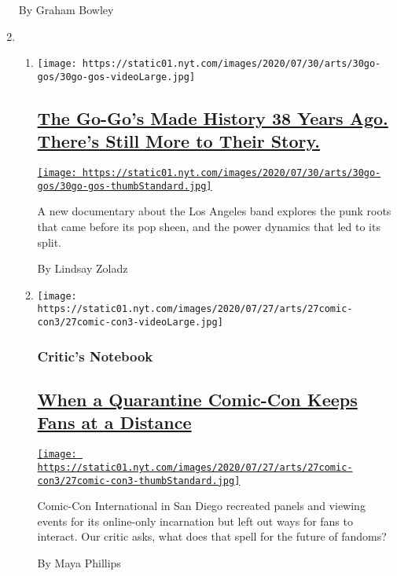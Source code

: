 \begin{enumerate}
  By Graham Bowley
\item
  \begin{enumerate}
  \def\labelenumii{\arabic{enumii}.}
  \item
    \texttt{[image: https://static01.nyt.com/images/2020/07/30/arts/30go-gos/30go-gos-videoLarge.jpg]}

    \hypertarget{the-go-gos-made-history-38-years-ago-theres-still-more-to-their-story}{%
    \subsection{\texorpdfstring{\href{/2020/07/29/arts/music/the-go-gos-documentary.html}{The
    Go-Go's Made History 38 Years Ago. There's Still More to Their
    Story.}}{The Go-Go's Made History 38 Years Ago. There's Still More to Their Story.}}\label{the-go-gos-made-history-38-years-ago-theres-still-more-to-their-story}}

    \href{/2020/07/29/arts/music/the-go-gos-documentary.html}{\texttt{[image: https://static01.nyt.com/images/2020/07/30/arts/30go-gos/30go-gos-thumbStandard.jpg]}}

    A new documentary about the Los Angeles band explores the punk roots
    that came before its pop sheen, and the power dynamics that led to
    its split.

    By Lindsay Zoladz
  \item
    \texttt{[image: https://static01.nyt.com/images/2020/07/27/arts/27comic-con3/27comic-con3-videoLarge.jpg]}

    \hypertarget{critics-notebook}{%
    \subsubsection{Critic's Notebook}\label{critics-notebook}}

    \hypertarget{when-a-quarantine-comic-con-keeps-fans-at-a-distance}{%
    \subsection{\texorpdfstring{\href{/2020/07/29/arts/comic-con-fandom-quarantine.html}{When
    a Quarantine Comic-Con Keeps Fans at a
    Distance}}{When a Quarantine Comic-Con Keeps Fans at a Distance}}\label{when-a-quarantine-comic-con-keeps-fans-at-a-distance}}

    \href{/2020/07/29/arts/comic-con-fandom-quarantine.html}{\texttt{[image: https://static01.nyt.com/images/2020/07/27/arts/27comic-con3/27comic-con3-thumbStandard.jpg]}}

    Comic-Con International in San Diego recreated panels and viewing
    events for its online-only incarnation but left out ways for fans to
    interact. Our critic asks, what does that spell for the future of
    fandoms?

    By Maya Phillips
  \end{enumerate}
\end{enumerate}

